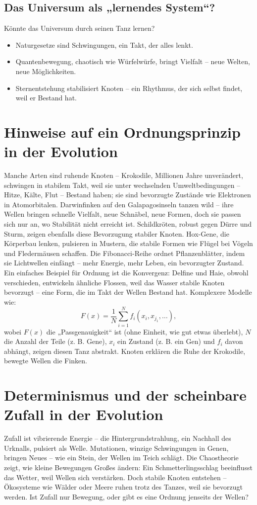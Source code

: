 \documentclass{article}
\begin{document}
	\subsection*{Das Universum als „lernendes System“?}
	Könnte das Universum durch seinen Tanz lernen?
	\begin{itemize}
		\item Naturgesetze sind Schwingungen, ein Takt, der alles lenkt.
		\item Quantenbewegung, chaotisch wie Würfelwürfe, bringt Vielfalt – neue Welten, neue Möglichkeiten.
		\item Sternentstehung stabilisiert Knoten – ein Rhythmus, der sich selbst findet, weil er Bestand hat.
	\end{itemize}
	
	\section{Hinweise auf ein Ordnungsprinzip in der Evolution}
	Manche Arten sind ruhende Knoten – Krokodile, Millionen Jahre unverändert, schwingen in stabilem Takt, weil sie unter wechselnden Umweltbedingungen – Hitze, Kälte, Flut – Bestand haben; sie sind bevorzugte Zustände wie Elektronen in Atomorbitalen. Darwinfinken auf den Galapagosinseln tanzen wild – ihre Wellen bringen schnelle Vielfalt, neue Schnäbel, neue Formen, doch sie passen sich nur an, wo Stabilität nicht erreicht ist. Schildkröten, robust gegen Dürre und Sturm, zeigen ebenfalls diese Bevorzugung stabiler Knoten. Hox-Gene, die Körperbau lenken, pulsieren in Mustern, die stabile Formen wie Flügel bei Vögeln und Fledermäusen schaffen. Die Fibonacci-Reihe ordnet Pflanzenblätter, indem sie Lichtwellen einfängt – mehr Energie, mehr Leben, ein bevorzugter Zustand. Ein einfaches Beispiel für Ordnung ist die Konvergenz: Delfine und Haie, obwohl verschieden, entwickeln ähnliche Flossen, weil das Wasser stabile Knoten bevorzugt – eine Form, die im Takt der Wellen Bestand hat. Komplexere Modelle wie:
	\begin{equation}
		F(x) = \frac{1}{N} \sum_{i=1}^N f_i(x_i, x_{j_1}, \ldots),
	\end{equation}
	wobei $F(x)$ die „Passgenauigkeit“ ist (ohne Einheit, wie gut etwas überlebt), $N$ die Anzahl der Teile (z. B. Gene), $x_i$ ein Zustand (z. B. ein Gen) und $f_i$ davon abhängt, zeigen diesen Tanz abstrakt. Knoten erklären die Ruhe der Krokodile, bewegte Wellen die Finken.
	
	\section{Determinismus und der scheinbare Zufall in der Evolution}
	Zufall ist vibrierende Energie – die Hintergrundstrahlung, ein Nachhall des Urknalls, pulsiert als Welle. Mutationen, winzige Schwingungen in Genen, bringen Neues – wie ein Stein, der Wellen im Teich schlägt. Die Chaostheorie zeigt, wie kleine Bewegungen Großes ändern: Ein Schmetterlingsschlag beeinflusst das Wetter, weil Wellen sich verstärken. Doch stabile Knoten entstehen – Ökosysteme wie Wälder oder Meere ruhen trotz des Tanzes, weil sie bevorzugt werden. Ist Zufall nur Bewegung, oder gibt es eine Ordnung jenseits der Wellen?
	
\end{document}
